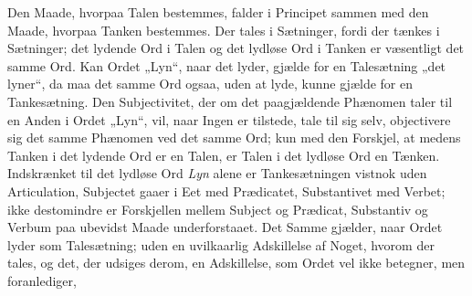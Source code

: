 \documentclass[12pt]{book}
\newcommand{\opage}[1]{\marginnote{\footnotesize\textit{[#1]}}}
\begin{document}
Den Maade, hvorpaa Talen bestemmes, falder i Principet
sammen med den Maade, hvorpaa Tanken bestemmes.
Der tales i Sætninger, fordi der tænkes i Sætninger; det
lydende Ord i Talen og det lydløse Ord i Tanken er væsentligt
det samme Ord. Kan Ordet „Lyn“, naar det lyder, gjælde for
en Talesætning „det lyner“, da maa det samme Ord ogsaa,
uden at lyde, kunne gjælde for en Tankesætning. Den Subjectivitet,
der om det paagjældende Phænomen taler til en
Anden i Ordet „Lyn“, vil, naar Ingen er tilstede, tale til sig
\opage{29}selv, objectivere sig det samme Phænomen ved det samme Ord;
kun med den Forskjel, at medens Tanken i det lydende Ord
er en Talen, er Talen i det lydløse Ord en Tænken. Indskrænket
til det lydløse Ord \emph{Lyn} alene er Tankesætningen
vistnok uden Articulation, Subjectet gaaer i Eet med Prædicatet,
Substantivet med Verbet; ikke destomindre er Forskjellen
mellem Subject og Prædicat, Substantiv og Verbum
paa ubevidst Maade underforstaaet. Det Samme gjælder,
naar Ordet lyder som Talesætning; uden en uvilkaarlig Adskillelse
af Noget, hvorom der tales, og det, der udsiges derom,
en Adskillelse, som Ordet vel ikke betegner, men foranlediger,
\end{document}
